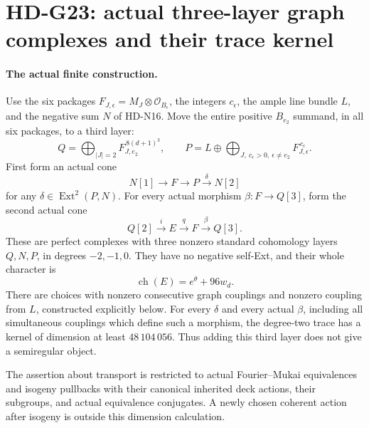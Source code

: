 \section{HD-G23: actual three-layer graph complexes and their trace kernel}
\label{sec:three-layer-graphs}

\paragraph{The actual finite construction.}
Use the six packages \(F_{J,\epsilon}=M_J\otimes\mathcal O_{B_\epsilon}\),
the integers \(c_\epsilon\), the ample line bundle \(L\), and
the negative sum \(N\) of HD-N16. Move the entire positive
\(B_{e_2}\) summand, in all six packages, to a third layer:
\[
 Q=\bigoplus_{|J|=2}F_{J,e_2}^{\,8(d+1)^3},\qquad
 P=L\oplus\bigoplus_{J,\ c_\epsilon>0,\ \epsilon\ne e_2}
                               F_{J,\epsilon}^{\,c_\epsilon}.
\]
First form an actual cone
\begin{equation}\label{eq:G23-F}
 N[1]\longrightarrow F\longrightarrow P
                              \xrightarrow{\delta}N[2]
\end{equation}
for any \(\delta\in\operatorname{Ext}^2(P,N)\). For every
actual morphism \(\beta:F\to Q[3]\), form the second actual cone
\begin{equation}\label{eq:G23-E}
 Q[2]\xrightarrow{i}E\xrightarrow{q}F
                                     \xrightarrow{\beta}Q[3].
\end{equation}
These are perfect complexes with three nonzero standard cohomology
layers \(Q,N,P\), in degrees \(-2,-1,0\). They have no negative
self-Ext, and their whole character is
\[
              \operatorname{ch}(E)=e^\theta+96w_d.
\]
There are choices with nonzero consecutive graph couplings and
nonzero coupling from \(L\), constructed explicitly below. For every
\(\delta\) and every actual \(\beta\), including all simultaneous
couplings which define such a morphism, the degree-two trace has a
kernel of dimension at least \(48\,104\,056\). Thus adding this
third layer does not give a semiregular object.

The assertion about transport is restricted to actual
Fourier--Mukai equivalences and isogeny pullbacks with their canonical
inherited deck actions, their subgroups, and actual equivalence
conjugates. A newly chosen coherent action after isogeny is outside
this dimension calculation.

